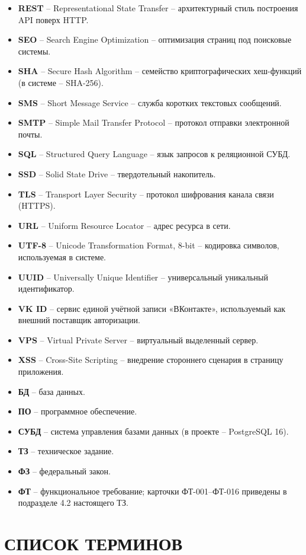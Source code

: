 \begin{itemize}[leftmargin=0pt, itemindent=1.5cm, labelsep=0pt, label={}]
\item \textbf{REST} -- Representational State Transfer -- архитектурный стиль построения API поверх HTTP.
\item \textbf{SEO} -- Search Engine Optimization -- оптимизация страниц под поисковые системы.
\item \textbf{SHA} -- Secure Hash Algorithm -- семейство криптографических хеш-функций (в системе -- SHA-256).
\item \textbf{SMS} -- Short Message Service -- служба коротких текстовых сообщений.
\item \textbf{SMTP} -- Simple Mail Transfer Protocol -- протокол отправки электронной почты.
\item \textbf{SQL} -- Structured Query Language -- язык запросов к реляционной СУБД.
\item \textbf{SSD} -- Solid State Drive -- твердотельный накопитель.
\item \textbf{TLS} -- Transport Layer Security -- протокол шифрования канала связи (HTTPS).
\item \textbf{URL} -- Uniform Resource Locator -- адрес ресурса в сети.
\item \textbf{UTF-8} -- Unicode Transformation Format, 8-bit -- кодировка символов, используемая в системе.
\item \textbf{UUID} -- Universally Unique Identifier -- универсальный уникальный идентификатор.
\item \textbf{VK ID} -- сервис единой учётной записи «ВКонтакте», используемый как внешний поставщик авторизации.
\item \textbf{VPS} -- Virtual Private Server -- виртуальный выделенный сервер.
\item \textbf{XSS} -- Cross-Site Scripting -- внедрение стороннего сценария в страницу приложения.
\item \textbf{БД} -- база данных.
\item \textbf{ПО} -- программное обеспечение.
\item \textbf{СУБД} -- система управления базами данных (в проекте -- PostgreSQL 16).
\item \textbf{ТЗ} -- техническое задание.
\item \textbf{ФЗ} -- федеральный закон.
\item \textbf{ФТ} -- функциональное требование; карточки ФТ-001--ФТ-016 приведены в подразделе 4.2 настоящего ТЗ.
\end{itemize}

\section*{\hspace*{\gostindent}СПИСОК ТЕРМИНОВ}

